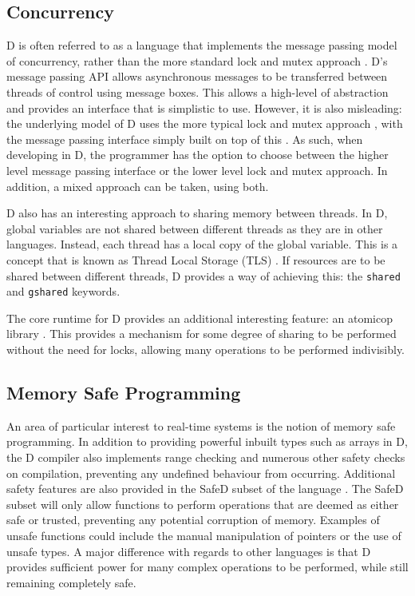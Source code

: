 \subsection{Concurrency}
D is often referred to as a language that implements the message passing model 
of concurrency, rather than the more standard lock and mutex approach 
\cite{ddili-book}. D's message passing API 
allows asynchronous messages to be transferred between threads of control using 
message boxes. This allows a high-level of abstraction and provides an 
interface that is simplistic to use. However, it is also misleading: the underlying 
model of D uses the more typical lock and mutex approach 
\cite{dlang-github-mutex}, 
with the message passing interface simply built on top of this 
\cite{dlang-github-concurrency}. 
As such, when developing in D, the programmer has the option to choose between 
the higher level message passing interface or the lower level lock and mutex 
approach. In addition, a mixed approach can be taken, using both. 
\par\bigskip\noindent
D also has an interesting approach to sharing memory between threads. In D, 
global variables are not shared between different threads as they are in 
other languages. Instead, each thread has a local copy of the global variable. 
This is a concept that is known as Thread Local Storage (TLS) 
\cite{migrate-to-shared}. 
If resources are to be shared between different threads, D provides a way of 
achieving this: the \texttt{shared} and
\texttt{\textunderscore{}\textunderscore{}gshared} keywords.
\par\bigskip\noindent
The core runtime for D provides an additional interesting feature: an atomicop 
library 
\cite{core-atomic}. 
This provides a mechanism for some degree of sharing to be performed without the 
need for locks, allowing many operations to be performed indivisibly.

\subsection{Memory Safe Programming}
An area of particular interest to real-time systems is the notion of memory 
safe programming. In addition to providing powerful inbuilt types such as arrays 
in D, the D compiler also implements range checking and numerous other 
safety checks on compilation, preventing any undefined behaviour from occurring.
Additional safety features are also provided in the SafeD subset of the language
\cite{safe-d}. The SafeD subset will only allow functions to perform 
operations that are deemed as either safe or trusted, preventing any 
potential corruption of memory. Examples of unsafe functions could include the 
manual manipulation of pointers or the use of unsafe types. A major difference 
with regards to other languages is that D provides sufficient power for many complex 
operations to be performed, while still remaining completely safe.

